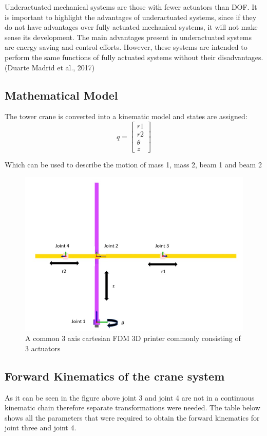 \documentclass{UoNMCHA}
\numberwithin{equation}{section}
\begin{document}
Underactuated mechanical systems are those with fewer actuators than DOF. It is important to highlight the advantages of underactuated systems, since if they do not have advantages over fully actuated mechanical systems, it will not make sense its development. The main advantages present in underactuated systems are energy saving and control efforts. However, these systems are intended to perform the same functions of fully actuated systems without their disadvantages. (Duarte Madrid et al., 2017)


\subsection{Mathematical Model}

The tower crane is converted into a kinematic model and states are assigned: 
\begin{equation}
q = 
\begin{bmatrix}
r1 \\ r2 \\ \theta \\ z
\end{bmatrix}
\end{equation}

Which can be used to describe the motion of mass 1, mass 2, beam 1 and beam 2

\begin{figure}[H]
	\begin{center}
		\includegraphics[width=.5\linewidth]{figs/Picture6}
		\caption{A  common 3 axis cartesian FDM 3D printer commonly consisting of 3 actuators}
		\label{figs/Picture6}
	\end{center}
\end{figure}

\subsection{Forward Kinematics of the crane system}

As it can be seen in the figure above joint 3 and joint 4 are not in a continuous kinematic chain therefore separate transformations were needed.  The table below shows all the parameters that were required to obtain the forward kinematics for joint three and joint 4.
\end{document}
